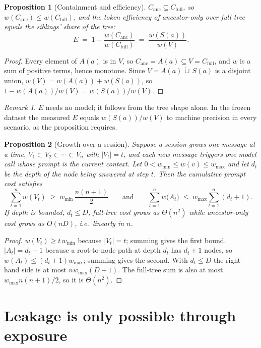\documentclass[11pt]{article}
\newtheorem{proposition}{Proposition}
\theoremstyle{definition}
\theoremstyle{remark}
\newtheorem*{remark}{Remark}
\newcommand{\A}{A(a)}
\newcommand{\Sib}{S(a)}
\newcommand{\w}{w}
\newcommand{\anc}{\mathrm{anc}}
\newcommand{\full}{\mathrm{full}}
\begin{document}
\begin{proposition}[Containment and efficiency]\label{prop:eff}
$C_\anc\subseteq C_\full$, so $\w(C_\anc)\le\w(C_\full)$, and the token
efficiency of ancestor-only over full tree equals the siblings' share of the
tree:
\[
  E \;=\; 1-\frac{\w(C_\anc)}{\w(C_\full)} \;=\; \frac{\w(\Sib)}{\w(V)} .
\]
\end{proposition}
\begin{proof}
Every element of $\A$ is in $V$, so $C_\anc=\A\subseteq V=C_\full$, and
$\w$ is a sum of positive terms, hence monotone. Since $V=\A\,\dot\cup\,\Sib$
is a disjoint union, $\w(V)=\w(\A)+\w(\Sib)$, so
$1-\w(\A)/\w(V)=\w(\Sib)/\w(V)$.
\end{proof}

\begin{remark}
$E$ needs no model; it follows from the tree shape alone. In the frozen
dataset the measured $E$ equals $\w(\Sib)/\w(V)$ to machine precision in
every scenario, as the proposition requires.
\end{remark}

\begin{proposition}[Growth over a session]\label{prop:growth}
Suppose a session grows one message at a time, $V_1\subset V_2\subset\cdots\subset V_n$
with $|V_t|=t$, and each new message triggers one model call whose prompt is
the current context. Let $0<w_{\min}\le\w(v)\le w_{\max}$ and let $d_t$ be the
depth of the node being answered at step $t$. Then the cumulative prompt cost
satisfies
\[
  \sum_{t=1}^{n}\w(V_t)\;\ge\;w_{\min}\,\frac{n(n+1)}{2}
  \qquad\text{and}\qquad
  \sum_{t=1}^{n}\w\bigl(A_t\bigr)\;\le\;w_{\max}\sum_{t=1}^{n}(d_t+1).
\]
If depth is bounded, $d_t\le D$, full-tree cost grows as $\Theta(n^2)$ while
ancestor-only cost grows as $O(nD)$, i.e.\ linearly in $n$.
\end{proposition}
\begin{proof}
$\w(V_t)\ge t\,w_{\min}$ because $|V_t|=t$; summing gives the first bound.
$|A_t|=d_t+1$ because a root-to-node path at depth $d_t$ has $d_t+1$ nodes,
so $\w(A_t)\le (d_t+1)w_{\max}$; summing gives the second. With $d_t\le D$
the right-hand side is at most $nw_{\max}(D+1)$. The full-tree sum is also at
most $w_{\max}n(n+1)/2$, so it is $\Theta(n^2)$.
\end{proof}

\section{Leakage is only possible through exposure}
\end{document}
